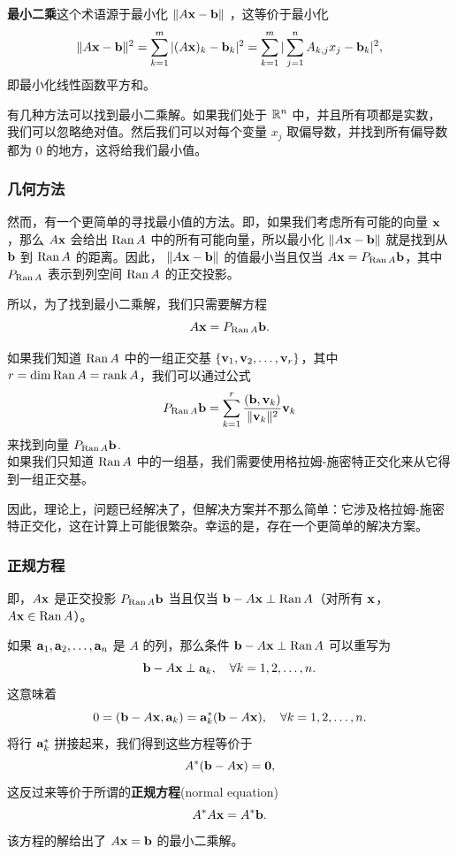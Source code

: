  \textbf{最小二乘}这个术语源于最小化 $\|A\mathbf{x} - \mathbf{b}\|$ ，这等价于最小化
 $$\|A\mathbf{x} - \mathbf{b}\|^2 = \sum_{k=1}^m |(A\mathbf{x})_k - \mathbf{b} _k|^2 = \sum_{k=1}^m |\sum_{j=1}^n A_{k,j} x_j - \mathbf{b}_k|^2,$$
 即最小化线性函数平方和。

有几种方法可以找到最小二乘解。如果我们处于 $\mathbb{R}^n$ 中，并且所有项都是实数，我们可以忽略绝对值。然后我们可以对每个变量 $x_j$ 取偏导数，并找到所有偏导数都为 $0$ 的地方，这将给我们最小值。

\subsubsection{几何方法}\label{sec:05-04-01-01}

然而，有一个更简单的寻找最小值的方法。即，如果我们考虑所有可能的向量 $\mathbf{x}$，那么 $A\mathbf{x}$ 会给出 $\operatorname{Ran} A$ 中的所有可能向量，所以最小化 $\|A\mathbf{x} - \mathbf{b}\|$ 就是找到从 $\mathbf{b}$ 到 $\operatorname{Ran} A$ 的距离。因此， $\|A\mathbf{x} - \mathbf{b}\|$ 的值最小当且仅当 $A\mathbf{x} = P_{\operatorname{Ran} A} \mathbf{b}$，其中 $P_{\operatorname{Ran} A}$ 表示到列空间 $\operatorname{Ran} A$ 的正交投影。

所以，为了找到最小二乘解，我们只需要解方程 $$A\mathbf{x} = P_{\operatorname{Ran} A} \mathbf{b}.$$

如果我们知道 $\operatorname{Ran} A$ 中的一组正交基 $\{\mathbf{v}_1, \mathbf{v}_2, \dots, \mathbf{v}_r\}$，其中 $r=\dim\operatorname{Ran} A=\operatorname{rank} A$，我们可以通过公式
$$P_{\operatorname{Ran} A} \mathbf{b} = \sum_{k=1}^r \frac{(\mathbf{b}, \mathbf{v}_k)}{\|\mathbf{v}_k\|^2} \mathbf{v}_k$$
来找到向量 $P_{\operatorname{Ran} A} \mathbf{b}$.~\\
如果我们只知道 $\operatorname{Ran} A$ 中的一组基，我们需要使用格拉姆-施密特正交化来从它得到一组正交基。

因此，理论上，问题已经解决了，但解决方案并不那么简单：它涉及格拉姆-施密特正交化，这在计算上可能很繁杂。幸运的是，存在一个更简单的解决方案。

\subsubsection{正规方程}\label{sec:05-04-01-02}

即，$A\mathbf{x}$ 是正交投影 $P_{\operatorname{Ran} A} \mathbf{b}$ 当且仅当 $\mathbf{b} - A\mathbf{x} \perp \operatorname{Ran} A$（对所有 $\mathbf{x}$，$A\mathbf{x} \in \operatorname{Ran} A$）。

如果 $\mathbf{a}_1, \mathbf{a}_2, \dots, \mathbf{a}_n$ 是 $A$ 的列，那么条件 $\mathbf{b} - A\mathbf{x} \perp \operatorname{Ran} A$ 可以重写为
$$\mathbf{b} - A\mathbf{x} \perp \mathbf{a}_k, \quad \forall k = 1, 2, \dots, n.$$
这意味着
$$0 = (\mathbf{b} - A\mathbf{x}, \mathbf{a}_k) = \mathbf{a}_k^*(\mathbf{b} - A\mathbf{x}), \quad \forall k = 1, 2, \dots, n.$$
将行 $\mathbf{a}_k^*$ 拼接起来，我们得到这些方程等价于
$$A^*(\mathbf{b} - A\mathbf{x}) = \mathbf{0},$$
这反过来等价于所谓的\textbf{正规方程}(normal equation)
$$A^*A\mathbf{x} = A^*\mathbf{b}.$$
该方程的解给出了 $A\mathbf{x} = \mathbf{b}$ 的最小二乘解。

